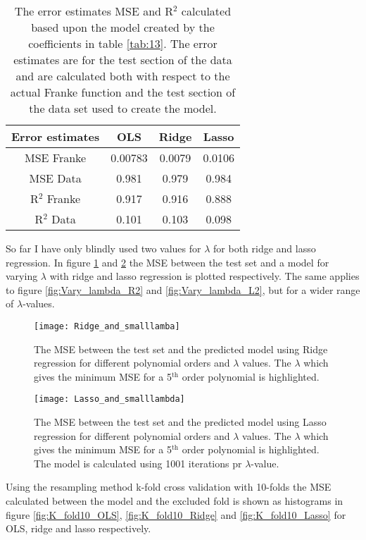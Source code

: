 \documentclass[uio,jmp,amsmath,amssymb,reprint,nofootinbib]{revtex4-1}
\numberwithin{equation}{section}
\begin{document}
\begin{table}
\begin{tabular}{|c|c|c|c|}\hline
Error estimates & OLS & Ridge & Lasso\\ \hline
MSE Franke & 0.00783 & 0.0079 & 0.0106 \\ \hline
MSE Data & 0.981 & 0.979 & 0.984 \\ \hline
R\(^2\) Franke & 0.917 & 0.916 & 0.888 \\ \hline
R\(^2\) Data & 0.101 & 0.103 & 0.098 \\ \hline
\end{tabular}
\caption{The error estimates MSE and R\(^2\) calculated based upon the model created by the coefficients in table \ref{tab:13}. The error estimates are for the test section of the data and are calculated both with respect to the actual Franke function and the test section of the data set used to create the model.}
\label{tab:05}
\end{table}

So far I have only blindly used two values for \(\lambda\) for both ridge and lasso regression. In figure \ref{fig:Vary_lambda_R} and \ref{fig:Vary_lambda_L} the MSE between the test set and a model for varying \(\lambda\) with ridge and lasso regression is plotted respectively. The same applies to figure \ref{fig:Vary_lambda_R2} and \ref{fig:Vary_lambda_L2}, but for a wider range of \(\lambda\)-values.

\begin{figure}[H]
    \centering
    \texttt{[image: Ridge\_and\_smalllamba]}
    \caption{The MSE between the test set and the predicted model using Ridge regression for different polynomial orders and \(\lambda\) values. The \(\lambda\) which gives the minimum MSE for a 5\(^\text{th}\) order polynomial is highlighted.}
    \label{fig:Vary_lambda_R}
\end{figure}

\begin{figure}[H]
    \centering
    \texttt{[image: Lasso\_and\_smalllambda]}
    \caption{The MSE between the test set and the predicted model using Lasso regression for different polynomial orders and \(\lambda\) values. The \(\lambda\) which gives the minimum MSE for a 5\(^\text{th}\) order polynomial is highlighted. The model is calculated using 1001 iterations pr \(\lambda\)-value.}
    \label{fig:Vary_lambda_L}
\end{figure}

Using the resampling method k-fold cross validation with 10-folds the MSE calculated between the model and the excluded fold is shown as histograms in figure \ref{fig:K_fold10_OLS}, \ref{fig:K_fold10_Ridge} and \ref{fig:K_fold10_Lasso} for OLS, ridge and lasso respectively.
\end{document}

